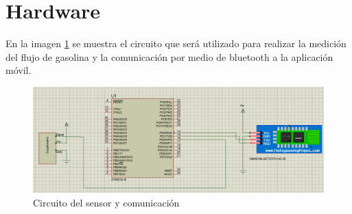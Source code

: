 \section{Hardware}
En la imagen \ref{fig:circuito} se muestra el circuito que será utilizado para realizar la medición del flujo de gasolina y la comunicación por medio de bluetooth a la aplicación móvil.
\\
\begin{figure}[H]
	\centering
	\includegraphics[width=1\textwidth]{Capitulo4/hardware/images/Caudalimetro}
	\caption{Circuito del sensor y comunicación}
	\label{fig:circuito}
\end{figure}

